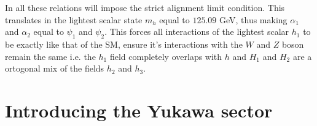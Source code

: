 In all these relations will impose the strict alignment limit condition. This translates in the lightest scalar state $m_h$ equal to $125.09$ GeV, thus making $\alpha_1$ and $\alpha_2$ equal to $\psi_1$ and $\psi_2$. 
%
This forces all interactions of the lightest scalar $h_1$ to be exactly like that of the SM, ensure it's interactions with the $W$ and $Z$ boson remain the same i.e. the $h_1$ field completely overlaps with $h$ and $H_1$ and $H_2$ are a ortogonal mix of the fields $h_2$ and $h_3$. 


%
%

\section{Introducing the Yukawa sector}


